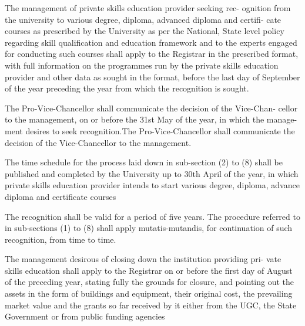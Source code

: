 \documentclass[default]{mhact}
\begin{document}
      \begin{subsectionlist}
    

The management of private skills education provider seeking rec- ognition from the university to various degree, diploma, advanced diploma and certifi- cate courses as prescribed by the University as per the National, State level policy regarding skill qualification and education framework and to the experts engaged for conducting such courses shall apply to the Registrar in the prescribed format, with full information on the programmes run by the private skills education provider and other data as sought in the format, before the last day of September of the year preceding the year from which the recognition is sought.


The Pro-Vice-Chancellor shall communicate the decision of the Vice-Chan- cellor to the management, on or before the 31st May of the year, in which the manage- ment desires to seek recognition.The Pro-Vice-Chancellor shall communicate the decision of the Vice-Chancellor to the management.


The time schedule for the process laid down in sub-section (2) to (8) shall be published and completed by the University up to 30th April of the year, in which private skills education provider intends to start various degree, diploma, advance diploma and certificate courses


The recognition shall be valid for a period of five years. The procedure referred to in sub-sections (1) to (8) shall apply mutatis-mutandis, for continuation of such recognition, from time to time.


The management desirous of closing down the institution providing pri- vate skills education shall apply to the Registrar on or before the first day of August of the preceding year, stating fully the grounds for closure, and pointing out the assets in the form of buildings and equipment, their original cost, the prevailing market value and the grants so far received by it either from the UGC, the State Government or from public funding agencies

       \end{subsectionlist}
    
\end{document}
